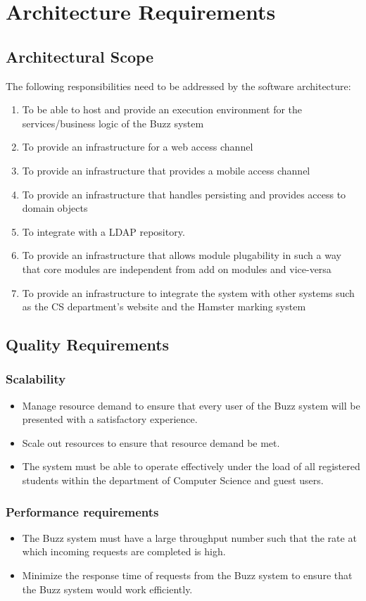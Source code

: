 \documentclass[12pt, oneside]{article}
\begin{document}
\section{Architecture Requirements}
	\subsection{Architectural Scope}
	The following responsibilities need to be addressed by the software architecture:
	\begin{enumerate}
		\item To be able to host and provide an execution environment for the services/business logic of the Buzz system
		\item To provide an infrastructure for a web access channel
		\item To provide an infrastructure that provides a mobile access channel
		\item To provide an infrastructure that handles persisting and provides access to domain objects
		\item To integrate with a LDAP repository.
		\item To provide an infrastructure that allows module plugability in such a way that core modules are independent from add on modules and vice-versa
		\item To provide an infrastructure to integrate the system with other systems such as the CS department's website and the Hamster marking system
	\end{enumerate}
	\subsection{Quality Requirements}
		\subsubsection{Scalability}
			\begin{itemize} 
				\item Manage resource demand to ensure that every user of the Buzz system will be presented with a satisfactory experience.
				\item Scale out resources to ensure that resource demand be met.
				\item The system must be able to operate effectively under the load of all registered students within the department of Computer Science and guest users.
			\end{itemize}
			
		\subsubsection{Performance requirements}
			\begin{itemize}
				\item The Buzz system must have a large throughput number such that the rate at which incoming requests are completed is high.
				\item Minimize the response time of requests from the Buzz system to ensure that the Buzz system would work efficiently.
			\end{itemize}
\end{document}
